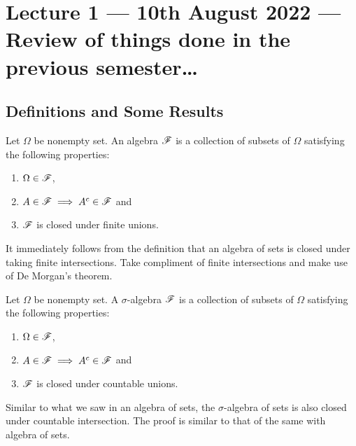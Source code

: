 \section{Lecture 1 --- 10th August 2022 --- Review of things done in the previous semester\ldots}



\subsection{Definitions and Some Results}
\begin{definition}[algebra]
    Let $\Omega$ be nonempty set. An algebra ${\mathscr F}$ is a collection of subsets of $\Omega$ satisfying the following properties:
    \begin{enumerate}
	\item $\Omega \in {\mathscr F}$,
	\item $A\in {\mathscr F} \implies A^c \in {\mathscr F}$ and
	\item ${\mathscr F}$ is closed under finite unions.
    \end{enumerate}
    \label{def:algebra}
\end{definition}

\begin{remark}
    It immediately follows from the definition that an algebra of sets is closed under taking finite intersections. Take compliment of finite intersections and make use of De Morgan's theorem.
\end{remark}

\begin{definition}
    Let $\Omega$ be nonempty set. A $\sigma$-algebra ${\mathscr F}$ is a collection of subsets of $\Omega$ satisfying the following properties:
    \begin{enumerate}
	\item $\Omega \in {\mathscr F}$,
	\item $A\in {\mathscr F} \implies A^c \in {\mathscr F}$ and
	\item ${\mathscr F}$ is closed under countable unions.
    \end{enumerate}
    \label{def:sigma-algebra}
\end{definition}

\begin{remark}
    Similar to what we saw in an algebra of sets, the $\sigma$-algebra of sets is also closed under countable intersection. The proof is similar to that of the same with algebra of sets.
\end{remark}

